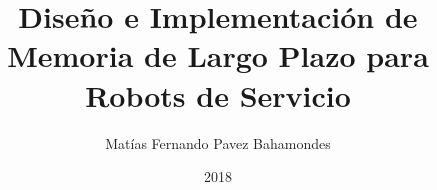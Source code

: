 \documentclass[upright, contnum]{umemoria}
\author{Matías Fernando Pavez Bahamondes}
\title{Diseño e Implementación de Memoria de Largo Plazo para Robots de Servicio}
\date{2018}
\begin{document}
	
\frontmatter
\maketitle




\cleardoublepage
\tableofcontents
\cleardoublepage
\listoftables
\cleardoublepage
\listoffigures


\mainmatter








%



%
%

\appendix
\begin{appendices}


%
\end{appendices}
\end{document}
